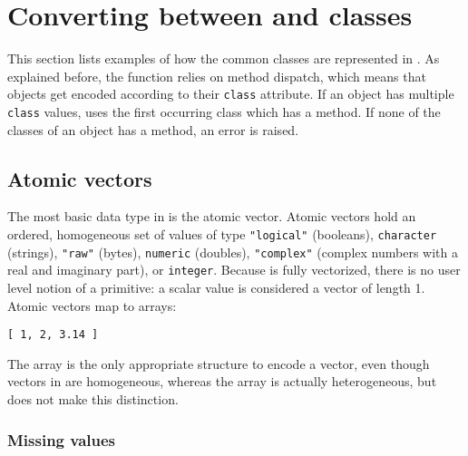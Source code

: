 \section{Converting between \JSON and \R classes}
 
This section lists examples of how the common \R classes are represented in \JSON. As explained before, the \toJSON function relies on method dispatch, which means that objects get encoded according to their \texttt{class} attribute. If an object has multiple \texttt{class} values, \R uses the first occurring class which has a \toJSON method. If none of the classes of an object has a \toJSON method, an error is raised.

\subsection{Atomic vectors}

The most basic data type in \R is the atomic vector. Atomic vectors hold an ordered, homogeneous set of values of type \texttt{"logical"} (booleans), \texttt{character} (strings), \texttt{"raw"} (bytes), \texttt{numeric} (doubles), \texttt{"complex"} (complex numbers with a real and imaginary part), or \texttt{integer}. Because \R is fully vectorized, there is no user level notion of a primitive: a scalar value is considered a vector of length 1. Atomic vectors map to \JSON arrays:

\begin{knitrout}\mycodesize
{}\color{fgcolor}\begin{kframe}
\begin{alltt}
 \hlkwb{<-} \hlstd{(}\hlstd{,} 
\hlstd{(}
\end{alltt}
\begin{verbatim}
[ 1, 2, 3.14 ]
\end{verbatim}
\end{kframe}
\end{knitrout}


The \JSON array is the only appropriate structure to encode a vector, even though vectors in \R are homogeneous, whereas the \JSON array is actually heterogeneous, but \JSON does not make this distinction.

\subsubsection{Missing values}

